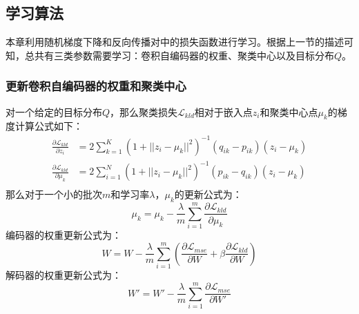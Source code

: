 \subsection{学习算法}
本章利用随机梯度下降和反向传播对中的损失函数进行学习。根据上一节的描述可知，总共有三类参数需要学习：卷积自编码器的权重、聚类中心以及目标分布$Q$。
\subsubsection{更新卷积自编码器的权重和聚类中心}
对一个给定的目标分布$Q$，那么聚类损失$\mathscr{L}_{kld}$相对于嵌入点$z_i$和聚类中心点$\mu_k$的梯度计算公式如下：
\begin{align}
	\frac{\partial \mathscr{L}_{kld}}{\partial z_i} &= 2\sum_{k=1}^K(1+||z_i-\mu_k||^2)^{-1}(q_{ik}-p_{ik})(z_i-\mu_k) \\
	\frac{\partial \mathscr{L}_{kld}}{\partial \mu_k} &= 2\sum_{i=1}^N(1+||z_i-\mu_k||^2)^{-1}(p_{ik}-q_{ik})(z_i-\mu_k) \\
\end{align}
那么对于一个小的批次$m$和学习率$\lambda$，$\mu_k$的更新公式为：
\begin{equation}
	\mu_k=\mu_k-\frac{\lambda}{m}\sum_{i=1}^m{\frac{\partial \mathscr{L}_{kld}}{\partial \mu_k}}
\end{equation}
编码器的权重更新公式为：
\begin{equation}
	W=W-\frac{\lambda}{m}\sum_{i=1}^m(\frac{\partial \mathscr{L}_{mse}}{\partial W} + \beta \frac{\partial \mathscr{L}_{kld}}{\partial W})
	\label{equ:encoder_update}
\end{equation}
解码器的权重更新公式为：
\begin{equation}
	W'=W'-\frac{\lambda}{m}\sum_{i=1}^m{\frac{\partial \mathscr{L}_{mse}}{\partial W'}}
\end{equation}

